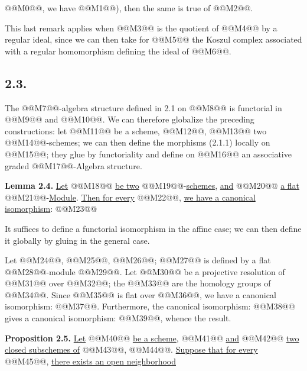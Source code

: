 @@M0@@, we have @@M1@@), then the same is true of @@M2@@.

This last remark applies when @@M3@@ is the quotient of @@M4@@ by a regular ideal, since we can then take for @@M5@@ the Koszul complex associated with a regular homomorphism defining the ideal of @@M6@@.

\subsection*{2.3.}
The @@M7@@-algebra structure defined in 2.1 on @@M8@@ is functorial in @@M9@@ and @@M10@@. We can therefore globalize the preceding constructions: let @@M11@@ be a scheme, @@M12@@, @@M13@@ two @@M14@@-schemes; we can then define the morphisms (2.1.1) locally on @@M15@@; they glue by functoriality and define on @@M16@@ an associative graded @@M17@@-Algebra structure.

\textbf{Lemma 2.4.} \uline{Let} @@M18@@ \uline{be two} @@M19@@-\uline{schemes}, \uline{and} @@M20@@ \uline{a flat} @@M21@@-\uline{Module}. \uline{Then for every} @@M22@@, \uline{we have a canonical isomorphism}:
@@M23@@

It suffices to define a functorial isomorphism in the affine case; we can then define it globally by gluing in the general case.

Let @@M24@@, @@M25@@, @@M26@@; @@M27@@ is defined by a flat @@M28@@-module @@M29@@. Let @@M30@@ be a projective resolution of @@M31@@ over @@M32@@; the @@M33@@ are the homology groups of @@M34@@. Since @@M35@@ is flat over @@M36@@, we have a canonical isomorphism: @@M37@@. Furthermore, the canonical isomorphism: @@M38@@ gives a canonical isomorphism: @@M39@@, whence the result.

\textbf{Proposition 2.5.} \uline{Let} @@M40@@ \uline{be a scheme}, @@M41@@ \uline{and} @@M42@@ \uline{two closed subschemes of} @@M43@@, @@M44@@. \uline{Suppose that for every} @@M45@@, \uline{there exists an open neighborhood}

